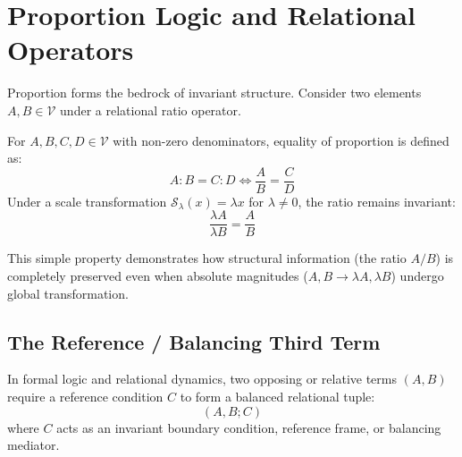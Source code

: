 \section{Proportion Logic and Relational Operators}
\label{sec:proportion_logic}

Proportion forms the bedrock of invariant structure. Consider two elements $A, B \in \mathcal{V}$ under a relational ratio operator.

\begin{definition}
For $A, B, C, D \in \mathcal{V}$ with non-zero denominators, equality of proportion is defined as:
\begin{equation}
A : B = C : D \iff \frac{A}{B} = \frac{C}{D}
\end{equation}
Under a scale transformation $\mathcal{S}_\lambda(x) = \lambda x$ for $\lambda \neq 0$, the ratio remains invariant:
\begin{equation}
\frac{\lambda A}{\lambda B} = \frac{A}{B}
\end{equation}
\end{definition}

This simple property demonstrates how structural information (the ratio $A/B$) is completely preserved even when absolute magnitudes ($A, B \to \lambda A, \lambda B$) undergo global transformation.

\subsection{The Reference / Balancing Third Term}
In formal logic and relational dynamics, two opposing or relative terms $(A, B)$ require a reference condition $C$ to form a balanced relational tuple:
\begin{equation}
(A, B; C)
\end{equation}
where $C$ acts as an invariant boundary condition, reference frame, or balancing mediator.
